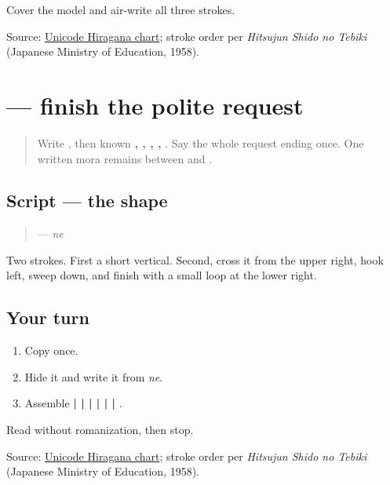 \begin{tcolorbox}[breakable,colback=teal!4,colframe=teal!35!black,title={Before you move on}]
Cover the model and air-write all three strokes.

Source: \href{https://www.unicode.org/charts/PDF/U3040.pdf}{Unicode Hiragana chart}; stroke order per \emph{Hitsujun Shido no Tebiki} (Japanese Ministry of Education, 1958).
\end{tcolorbox}
\section[\texorpdfstring{\ja{ね} (ne)}{ね (ne)}]{ — finish the polite request}

\label{lesson:JA-W10-ne}



\begin{quote}
Write \textbf{}, then known \textbf{, , , , }. Say the whole request ending once. One written mora remains between \textbf{} and \textbf{}.
\end{quote}

\subsection*{Script — the shape}

\begin{quote}
\textbf{} — \emph{ne}
\end{quote}

Two strokes. First a short vertical. Second, cross it from the upper right, hook left, sweep down, and finish with a small loop at the lower right.

\subsection*{Your turn}
\begin{enumerate}
\raggedright
  \item Copy \textbf{} once.
  \item Hide it and write it from \emph{ne}.
  \item Assemble \textbf{ |  |  |  |  |  | }.
\end{enumerate}

\begin{tcolorbox}[breakable,colback=teal!4,colframe=teal!35!black,title={Before you move on}]
Read \textbf{} without romanization, then stop.

Source: \href{https://www.unicode.org/charts/PDF/U3040.pdf}{Unicode Hiragana chart}; stroke order per \emph{Hitsujun Shido no Tebiki} (Japanese Ministry of Education, 1958).
\end{tcolorbox}
